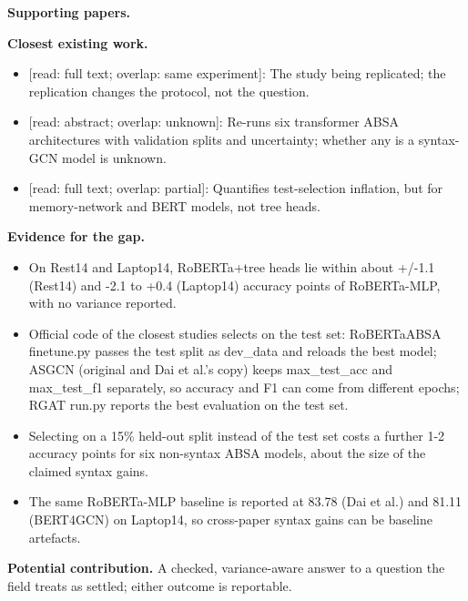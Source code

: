 \documentclass[11pt,a4paper]{article}
\begin{document}
\textbf{Supporting papers.} \cite{dai2021syntax,mukherjee2021repro,lebmeier2023repro}

\textbf{Closest existing work.}
\begin{itemize}
\item \cite{dai2021syntax} [read: full text; overlap: same experiment]: The study being replicated; the replication changes the protocol, not the question.
\item \cite{lebmeier2023repro} [read: abstract; overlap: unknown]: Re-runs six transformer ABSA architectures with validation splits and uncertainty; whether any is a syntax-GCN model is unknown.
\item \cite{mukherjee2021repro} [read: full text; overlap: partial]: Quantifies test-selection inflation, but for memory-network and BERT models, not tree heads.
\end{itemize}

\textbf{Evidence for the gap.}
\begin{itemize}
\item [V] On Rest14 and Laptop14, RoBERTa+tree heads lie within about +/-1.1 (Rest14) and -2.1 to +0.4 (Laptop14) accuracy points of RoBERTa-MLP, with no variance reported. \cite{dai2021syntax}
\item [V] Official code of the closest studies selects on the test set: RoBERTaABSA finetune.py passes the test split as dev\_data and reloads the best model; ASGCN (original and Dai et al.'s copy) keeps max\_test\_acc and max\_test\_f1 separately, so accuracy and F1 can come from different epochs; RGAT run.py reports the best evaluation on the test set. \cite{dai2021syntax,zhang2019asgcn,wang2020rgat}
\item [V] Selecting on a 15\% held-out split instead of the test set costs a further 1-2 accuracy points for six non-syntax ABSA models, about the size of the claimed syntax gains. \cite{mukherjee2021repro}
\item [V] The same RoBERTa-MLP baseline is reported at 83.78 (Dai et al.) and 81.11 (BERT4GCN) on Laptop14, so cross-paper syntax gains can be baseline artefacts. \cite{dai2021syntax,xiao2021bert4gcn}
\end{itemize}

\textbf{Potential contribution.} A checked, variance-aware answer to a question the field treats as settled; either outcome is reportable.
\end{document}
